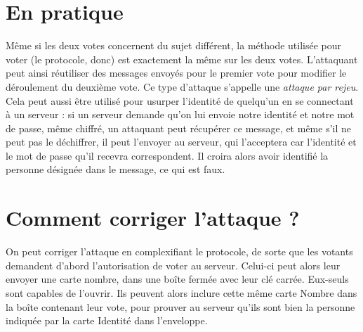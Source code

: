 \documentclass[a4paper,10pt]{article}
\begin{document}
\section{En pratique}
Même si les deux votes concernent du sujet différent, la méthode utilisée pour voter (le protocole, donc) est exactement la même sur les deux votes. L'attaquant peut ainsi réutiliser des messages envoyés pour le premier vote pour modifier le déroulement du deuxième vote. Ce type d'attaque s'appelle une \emph{attaque par rejeu}. Cela peut aussi être utilisé pour usurper l'identité de quelqu'un en se connectant à un serveur : si un serveur demande qu'on lui envoie notre identité et notre mot de passe, même chiffré, un attaquant peut récupérer ce message, et même s'il ne peut pas le déchiffrer, il peut l'envoyer au serveur, qui l'acceptera car l'identité et le mot de passe qu'il recevra correspondent. Il croira alors avoir identifié la personne désignée dans le message, ce qui est faux.


\section{Comment corriger l'attaque ?}
On peut corriger l'attaque en complexifiant le protocole, de sorte que les votants demandent d'abord l'autorisation de voter au serveur. Celui-ci peut alors leur envoyer une carte nombre, dans une boîte fermée avec leur clé carrée. Eux-seuls sont capables de l'ouvrir. Ils peuvent alors inclure cette même carte Nombre dans la boîte contenant leur vote, pour prouver au serveur qu'ils sont bien la personne indiquée par la carte Identité dans l'enveloppe.
\end{document}
